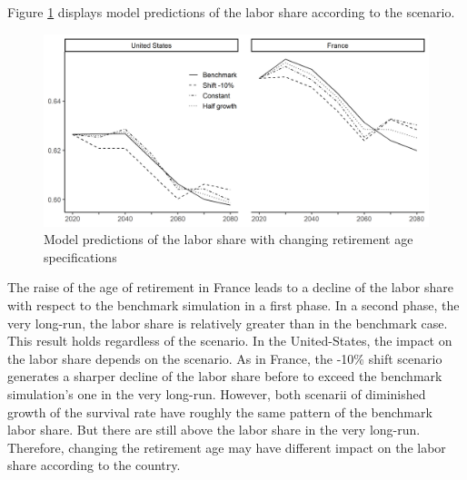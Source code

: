 Figure \ref{fig:retage_ls} displays model predictions of the labor share according to the scenario.
\begin{figure}[tb]
	\centering
	\caption{Model predictions of the labor share with changing retirement age specifications} \label{fig:retage_ls}
	\includegraphics[width=1\linewidth]{../result/retirement/retage_ls.png}
\end{figure}
The raise of the age of retirement in France leads to a decline of the labor share with respect to the benchmark simulation in a first phase. In a second phase, the very long-run, the labor share is relatively greater than in the benchmark case. This result holds regardless of the scenario. In the United-States, the impact on the labor share depends on the scenario. As in France, the -10\% shift scenario generates a sharper decline of the labor share before to exceed the benchmark simulation's one in the very long-run. However, both scenarii of diminished growth of the survival rate have roughly the same pattern of the benchmark labor share. But there are still above the labor share in the very long-run. Therefore, changing the retirement age may have different impact on the labor share according to the country.


